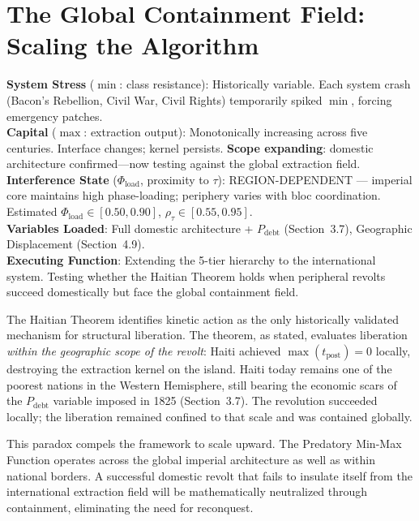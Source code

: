 \chapter{The Global Containment Field: Scaling the Algorithm}
\label{ch:global}

\begin{tcolorbox}[colback=black!5, colframe=black!70, fonttitle=\bfseries\ttfamily, title=RUNTIME LOG: SCALING DIAGNOSTIC TO IMPERIAL ARCHITECTURE]
\ttfamily\small
\textbf{System Stress} ($\min$: class resistance): Historically variable. Each system crash (Bacon's Rebellion{,} Civil War{,} Civil Rights) temporarily spiked $\min${,} forcing emergency patches.\\
\textbf{Capital} ($\max$: extraction output): Monotonically increasing across five centuries. Interface changes; kernel persists. \textbf{Scope expanding}: domestic architecture confirmed---now testing against the global extraction field.\\
\textbf{Interference State} ($\Phi_{\text{load}}$, proximity to $\tau$): REGION-DEPENDENT --- imperial core maintains high phase-loading; periphery varies with bloc coordination. Estimated $\Phi_{\text{load}} \in [0.50, 0.90]$, $\rho_{\tau} \in [0.55, 0.95]$.\\
\textbf{Variables Loaded}: Full domestic architecture + $P_{\text{debt}}$ (Section~3.7){,} Geographic Displacement (Section~4.9).\\
\textbf{Executing Function}: Extending the 5-tier hierarchy to the international system. Testing whether the Haitian Theorem holds when peripheral revolts succeed domestically but face the global containment field.
\end{tcolorbox}

\medskip

The Haitian Theorem identifies kinetic action as the only historically validated mechanism for structural liberation. The theorem, as stated, evaluates liberation \textit{within the geographic scope of the revolt}: Haiti achieved $\max(t_{\text{post}}) = 0$ locally, destroying the extraction kernel on the island. Haiti today remains one of the poorest nations in the Western Hemisphere, still bearing the economic scars of the $P_{\text{debt}}$ variable imposed in 1825 (Section~3.7). The revolution succeeded locally; the liberation remained confined to that scale and was contained globally.

This paradox compels the framework to scale upward. The Predatory Min-Max Function operates across the global imperial architecture as well as within national borders. A successful domestic revolt that fails to insulate itself from the international extraction field will be mathematically neutralized through containment, eliminating the need for reconquest.

